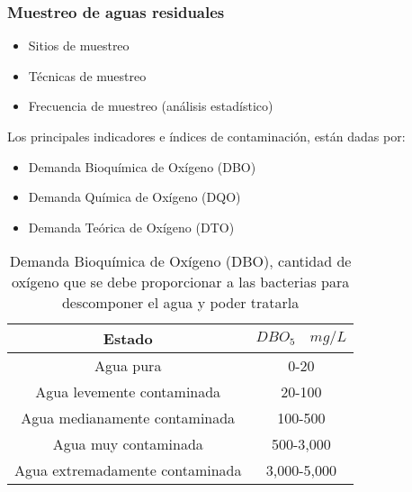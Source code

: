 \subsubsection{Muestreo de aguas residuales}
\begin{itemize}
    \item Sitios de muestreo
    \item Técnicas de muestreo
    \item Frecuencia de muestreo (análisis estadístico)
\end{itemize}
Los principales indicadores e índices de contaminación, están dadas por:
\begin{itemize}
    \item Demanda Bioquímica de Oxígeno (DBO)
    \item Demanda Química de Oxígeno (DQO)
    \item Demanda Teórica de Oxígeno (DTO)
\end{itemize}
\begin{table}[h!]
    \centering
    \begin{tabular}{@{}cc@{}}
    \toprule
    Estado                          & $DBO_5\quad mg/L$ \\ \midrule
    Agua pura                       & 0-20              \\
    Agua levemente contaminada      & 20-100            \\
    Agua medianamente contaminada   & 100-500           \\
    Agua muy contaminada            & 500-3,000         \\
    Agua extremadamente contaminada & 3,000-5,000       \\ \bottomrule
    \end{tabular}
    \caption{Demanda Bioquímica de Oxígeno (DBO), cantidad de oxígeno que se debe proporcionar a las bacterias para descomponer el agua y poder tratarla}
    \label{tabar1}
\end{table}

